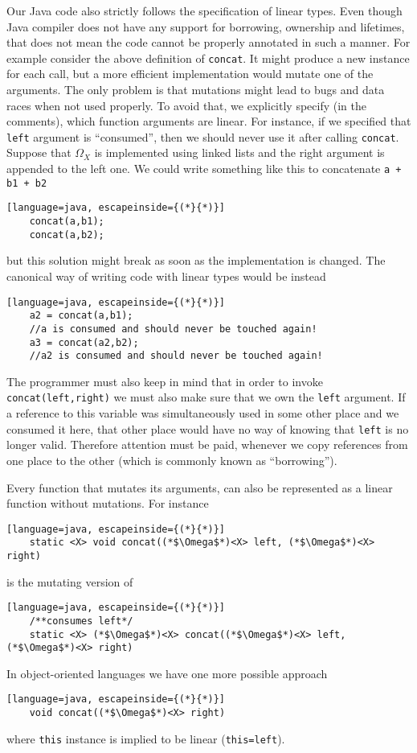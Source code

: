 Our Java code also strictly follows the specification of linear types. Even though Java compiler does not have any support for borrowing, ownership and lifetimes, that does not mean the code cannot be properly annotated in such a manner. For example consider the above definition of \texttt{concat}. It might produce a new instance for each call, but a more efficient implementation would mutate one of the arguments. The only problem is that mutations might lead to bugs and data races when not used properly. To avoid that, we explicitly specify (in the comments), which function arguments are linear.
For instance, if we specified that \texttt{left} argument is ``consumed'', then we should never use it after calling \texttt{concat}. Suppose that $\Omega_X$ is implemented using linked lists and the right argument is appended to the left one. We could write something like this to concatenate \texttt{a + b1 + b2}
\begin{lstlisting}[language=java, escapeinside={(*}{*)}]
	concat(a,b1);
	concat(a,b2);
\end{lstlisting}
but this solution might break as soon as the implementation is changed. The canonical way of writing code with linear types would be instead
\begin{lstlisting}[language=java, escapeinside={(*}{*)}]
	a2 = concat(a,b1);
	//a is consumed and should never be touched again!
	a3 = concat(a2,b2);
	//a2 is consumed and should never be touched again!
\end{lstlisting}
The programmer must also keep in mind that in order to invoke \texttt{concat(left,right)} we must also make sure that we own the \texttt{left} argument. If a reference to this variable was simultaneously used in some other place and we consumed it here, that other place would have no way of knowing that \texttt{left} is no longer valid. Therefore attention must be paid, whenever we copy references from one place to the other (which is commonly known as ``borrowing''). 

Every function that mutates its arguments, can also be represented as a linear function without mutations. For instance 
\begin{lstlisting}[language=java, escapeinside={(*}{*)}]
	static <X> void concat((*$\Omega$*)<X> left, (*$\Omega$*)<X> right)
\end{lstlisting}
is the mutating version of 
\begin{lstlisting}[language=java, escapeinside={(*}{*)}]
	/**consumes left*/
	static <X> (*$\Omega$*)<X> concat((*$\Omega$*)<X> left, (*$\Omega$*)<X> right)
\end{lstlisting}
In object-oriented languages we have one more possible approach
\begin{lstlisting}[language=java, escapeinside={(*}{*)}]
	void concat((*$\Omega$*)<X> right)
\end{lstlisting}
where \texttt{this} instance is implied to be linear (\texttt{this=left}).

